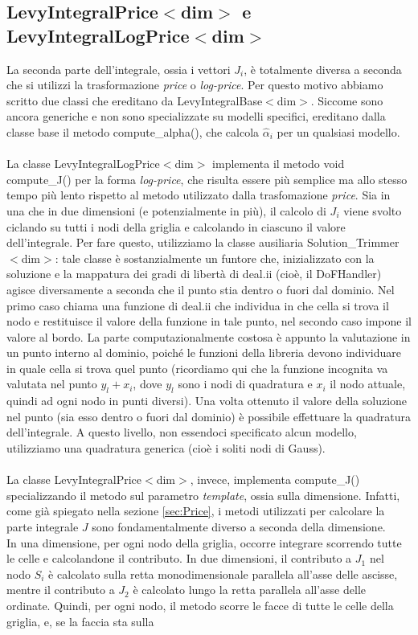 \documentclass[a4paper,10pt]{report}
\theoremstyle{plain}
\theoremstyle{definition}
\theoremstyle{remark}
\begin{document}
\subsection{\textsf{LevyIntegralPrice$<$dim$>$} e \textsf{LevyIntegralLogPrice$<$dim$>$}}
La seconda parte dell'integrale, ossia i vettori $J_i$, è totalmente diversa a seconda che si utilizzi la trasformazione \emph{price} o \emph{log-price}. Per questo motivo abbiamo scritto due classi che ereditano da \textsf{LevyIntegralBase$<$dim$>$}. Siccome sono ancora generiche e non sono specializzate su modelli specifici, ereditano dalla classe base il metodo \textsf{compute\_alpha()}, che calcola $\hat{\alpha}_i$ per un qualsiasi modello.\\\\La classe \textsf{LevyIntegralLogPrice$<$dim$>$} implementa il metodo \textsf{void compute\_J()} per la forma \emph{log-price}, che risulta essere pi\`u semplice ma allo stesso tempo più lento rispetto al metodo utilizzato dalla trasfomazione \emph{price}. Sia in una che in due dimensioni (e potenzialmente in più), il calcolo di $J_i$ viene svolto ciclando su tutti i nodi della griglia e calcolando in ciascuno il valore dell'integrale. Per fare questo, utilizziamo la classe ausiliaria \textsf{Solution\_Trimmer$<$dim$>$}: tale classe è sostanzialmente un funtore che, inizializzato con la soluzione e la mappatura dei gradi di libertà di \textsf{deal.ii} (cio\`e, il \textsf{DoFHandler}) agisce diversamente a seconda che il punto stia dentro o fuori dal dominio. Nel primo caso chiama una funzione di \textsf{deal.ii} che individua in che cella si trova il nodo e restituisce il valore della funzione in tale punto, nel secondo caso impone il valore al bordo. La parte computazionalmente costosa è appunto la valutazione in un punto interno al dominio, poiché le funzioni della libreria devono individuare in quale cella si trova quel punto (ricordiamo qui che la funzione incognita va valutata nel punto $y_l+x_i$, dove $y_l$ sono i nodi di quadratura e $x_i$ il nodo attuale, quindi ad ogni nodo in punti diversi). Una volta ottenuto il valore della soluzione nel punto (sia esso dentro o fuori dal dominio) è possibile effettuare la quadratura dell'integrale. A questo livello, non essendoci specificato alcun modello, utilizziamo una quadratura generica (cio\`e i soliti nodi di Gauss).\\\\La classe \textsf{LevyIntegralPrice$<$dim$>$}, invece, implementa \textsf{compute\_J()} specializzando il metodo sul parametro \emph{template}, ossia sulla dimensione. Infatti, come già spiegato nella sezione \ref{sec:Price}, i metodi utilizzati per calcolare la parte integrale $J$ sono fondamentalmente diverso a seconda della dimensione.\\In una dimensione, per ogni nodo della griglia, occorre integrare scorrendo tutte le celle e calcolandone il contributo. In due dimensioni, il contributo a $J_1$ nel nodo $S_i$ è calcolato sulla retta monodimensionale parallela all'asse delle ascisse, mentre il contributo a $J_2$ è calcolato lungo la retta parallela all'asse delle ordinate. Quindi, per ogni nodo, il metodo scorre le facce di tutte le celle della griglia, e, se la faccia sta sulla 
\end{document}
